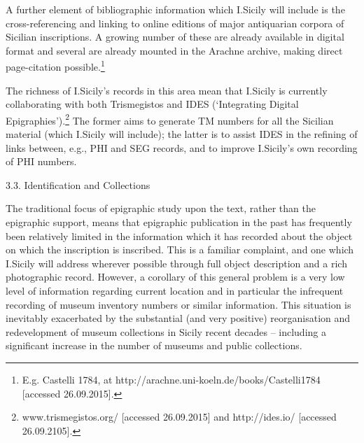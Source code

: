 \documentclass[amsthm,ebook]{saparticle}
\begin{document}
A further element of bibliographic information which I.Sicily will include is the cross-referencing and linking to
online editions of major antiquarian corpora of Sicilian inscriptions. A growing number of these are already available
in digital format and several are already mounted in the Arachne archive, making direct page-citation
possible.\footnote{ E.g. Castelli 1784, at http://arachne.uni-koeln.de/books/Castelli1784 [accessed 26.09.2015].}

The richness of I.Sicily’s records in this area mean that I.Sicily is currently collaborating with both Trismegistos and
IDES (‘Integrating Digital Epigraphies’).\footnote{ www.trismegistos.org/ [accessed 26.09.2015] and http://ides.io/
[accessed 26.09.2105].} The former aims to generate TM numbers for all the Sicilian material (which I.Sicily will
include); the latter is to assist IDES in the refining of links between, e.g., PHI and SEG records, and to improve
I.Sicily’s own recording of PHI numbers.


\bigskip

3.3. Identification and Collections

The traditional focus of epigraphic study upon the text, rather than the epigraphic support, means that epigraphic
publication in the past has frequently been relatively limited in the information which it has recorded about the
object on which the inscription is inscribed. This is a familiar complaint, and one which I.Sicily will address
wherever possible through full object description and a rich photographic record. However, a corollary of this general
problem is a very low level of information regarding current location and in particular the infrequent recording of
museum inventory numbers or similar information. This situation is inevitably exacerbated by the substantial (and very
positive) reorganisation and redevelopment of museum collections in Sicily recent decades – including a significant
increase in the number of museums and public collections.
\end{document}

